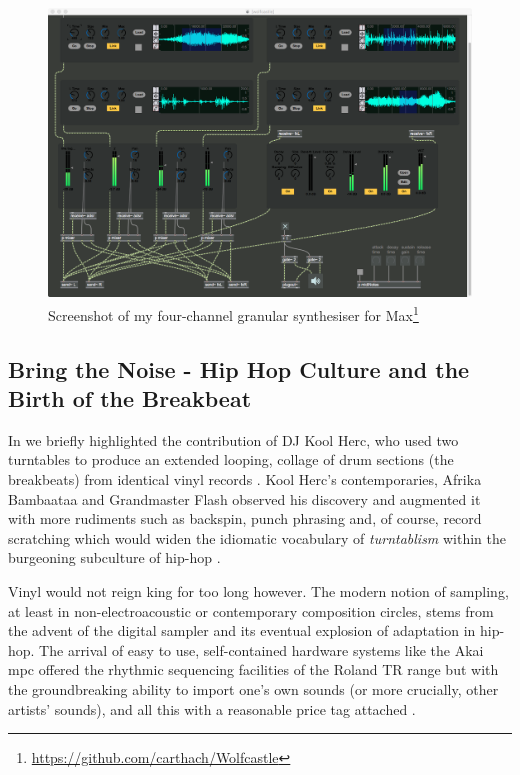 \begin{figure}
	\begin{center}
		\includegraphics[width=1.0\textwidth]{ch04_sota/figures/wolfecastle.png}
	\end{center}
	\caption[Screenshot of My Four-Channel Granular Synthesiser for Max]{Screenshot of my four-channel granular synthesiser for Max\footnote{\url{https://github.com/carthach/Wolfcastle}}}
	\label{fig:wolfcastle}
\end{figure}

\subsection{Bring the Noise - Hip Hop Culture and the Birth of the Breakbeat}

In  we briefly highlighted the contribution of DJ Kool Herc, who used two turntables to produce an extended looping, collage of drum sections (the breakbeats) from identical vinyl records \citep{Forman2004}. Kool Herc's contemporaries, Afrika Bambaataa and Grandmaster Flash observed his discovery and augmented it with more rudiments such as backspin, punch phrasing and, of course, record scratching which would widen the idiomatic vocabulary of \textit{turntablism} within the burgeoning subculture of hip-hop \citep{Smith2000}.

Vinyl would not reign king for too long however. The modern notion of sampling, at least in non-electroacoustic or contemporary composition circles, stems from the advent of the digital sampler and its eventual explosion of adaptation in hip-hop. The arrival of easy to use, self-contained hardware systems like the Akai \acrfull{mpc} offered the rhythmic sequencing facilities of the Roland TR range but with the groundbreaking ability to import one's own sounds (or more crucially, other artists' sounds), and all this with a reasonable price tag attached \citep{Rodgers2003}.

